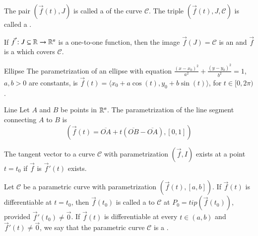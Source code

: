 \documentclass[12pt]{report}
\begin{document}
\begin{appendices}
    \begin{rmk}{}{}
        The pair $(\vec{f}(t), J)$ is called a  of the curve $\mathscr{C}$. The triple $(\vec{f}(t), J, \mathscr{C})$ is called a .
    \end{rmk}

    \begin{defn}{}{}
        If $\vec{f}:J \subseteq \mathbb R\rightarrow \mathbb R^n$ is a one-to-one function, then the image $\vec{f}(J) = \mathscr{C}$ is an  and $\vec{f}$ is a  which covers $\mathscr{C}$.
    \end{defn}

    \begin{rmk}{Ellipse}{}
        The parametrization of an ellipse with equation $\frac{(x-x_0)^2}{a^2} + \frac{(y-y_0)^2}{b^2} = 1$, $a,b > 0$ are constants, is $\vec{f}(t) = \langle x_0 + a\cos(t), y_0 + b\sin(t)\rangle$, for $t \in [0,2\pi)$.
    \end{rmk}


    \begin{rmk}{Line}{}
        Let $A$ and $B$ be points in $\mathbb R^n$. The parametrization of the line segment connecting $A$ to $B$ is \begin{equation}
            (\vec{f}(t) = \overline{OA} + t(\overline{OB} - \overline{OA}), [0,1])
        \end{equation}
    \end{rmk}


    \begin{defn}{}{}
        The tangent vector to a curve $\mathscr{C}$ with parametrization $(\vec{f}, I)$ exists at a point $t = t_0$ if $\vec{f}$ is $\vec{f}'(t)$ exists.
    \end{defn}


    \begin{defn}{}{}
        Let $\mathscr{C}$ be a parametric curve with parametrization $(\vec{f}(t),[a,b])$. If $\vec{f}(t)$ is differentiable at $t = t_0$, then $\vec{f}(t_0)$ is called a  to $\mathscr{C}$ at $P_0 = tip(\vec{f}(t_0))$, provided $\vec{f}'(t_0) \neq \vec{0}$. If $\vec{f}(t)$ is differentiable at every $t \in (a,b)$ and $\vec{f}'(t) \neq \vec{0}$, we say that the parametric curve $\mathscr{C}$ is a .
    \end{defn}
    


\end{appendices}
\end{document}
